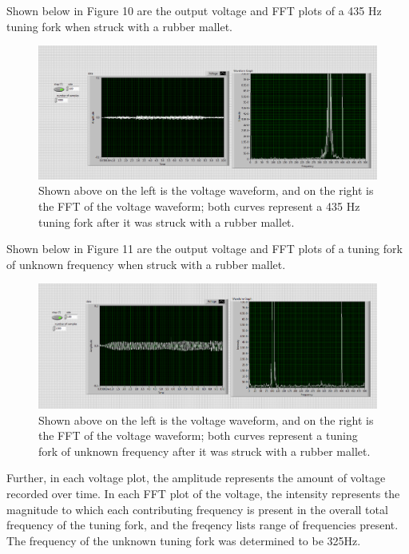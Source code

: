 \documentclass[twoside,10pt]{article}
\begin{document}
\begin{multicols}{2}
			Shown below in Figure 10 are the output voltage and FFT plots of a 435 Hz tuning fork when struck with a rubber mallet.
	
	
		\begin{figure}[H]
		\centering
		\includegraphics[width=\linewidth]{group4_435_waveform.png}
		\caption{Shown above on the left is the voltage waveform, and on the right is the FFT of the voltage waveform; both curves represent a 435 Hz tuning fork after it was struck with a rubber mallet.}
		\end{figure}
	
				Shown below in Figure 11 are the output voltage and FFT plots of a  tuning fork of unknown frequency when struck with a rubber mallet.
	
		\begin{figure}[H]
		\centering
		\includegraphics[width=\linewidth]{group4_unknown_waveform.png}
		\caption{Shown above on the left is the voltage waveform, and on the right is the FFT of the voltage waveform; both curves represent a tuning fork of unknown frequency after it was struck with a rubber mallet.}
		\end{figure}
	
		Further, in each voltage plot, the amplitude represents the amount of voltage recorded over time. In each FFT plot of the voltage, the intensity represents the magnitude to which each contributing frequency is present in the overall total frequency of the tuning fork, and the freqency lists range of frequencies present. The frequency of the unknown tuning fork was determined to be 325Hz.

\end{multicols}
\end{document}
